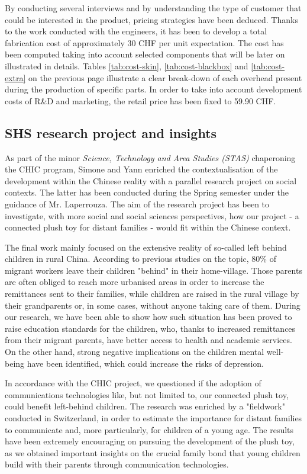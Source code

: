 \clearpage

\newpage

\medskip By conducting several interviews and by understanding the type of customer that could be interested in the product, pricing strategies have been deduced. Thanks to the work conducted with the engineers, it has been to develop a total fabrication cost of approximately 30 CHF per unit expectation. The cost has been computed taking into account selected components that will be later on illustrated in details. Tables \ref{tab:cost-skin}, \ref{tab:cost-blackbox} and \ref{tab:cost-extra} on the previous page illustrate a clear break-down of each overhead present during the production of specific parts. In order to take into account development costs of R\&D and marketing, the retail price has been fixed to 59.90 CHF. 

\subsection{SHS research project and insights}

As part of the minor \textit{Science, Technology and Area Studies (STAS)} chaperoning the CHIC program, Simone and Yann enriched the contextualisation of the development within the Chinese reality with a parallel research project on social contexts. The latter has been conducted during the Spring semester under the guidance of Mr. Laperrouza. The aim of the research project has been to investigate, with more social and social sciences perspectives, how our project - a connected plush toy for distant families - would fit within the Chinese context. 

\medskip
The final work mainly focused on the extensive reality of so-called left behind children in rural China. According to previous studies on the topic, 80\% of migrant workers leave their children "behind" in their home-village. Those parents are often obliged to reach more urbanised areas in order to increase the remittances sent to their families, while children are raised in the rural village by their grandparents or, in some cases, without anyone taking care of them. During our research, we have been able to show how such situation has been proved to raise education standards for the children, who, thanks to increased remittances from their migrant parents, have better access to health and academic services. On the other hand, strong negative implications on the children mental well-being have been identified, which could increase the risks of depression.

\medskip
In accordance with the CHIC project, we questioned if the adoption of communications technologies like, but not limited to, our connected plush toy, could benefit left-behind children. The research was enriched by a "fieldwork" conducted in Switzerland, in order to estimate the importance for distant families to communicate and, more particularly, for children of a young age. The results have been extremely encouraging on pursuing the development of the plush toy, as we obtained important insights on the crucial family bond that young children build with their parents through communication technologies. 